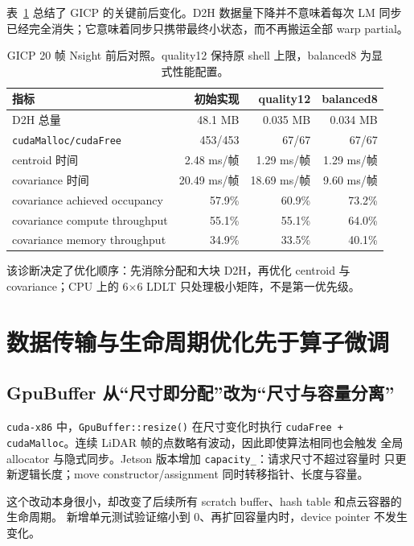 \documentclass[UTF8,a4paper,11pt,fontset=none]{ctexart}
\begin{document}
表~\ref{tab:nsight} 总结了 GICP 的关键前后变化。D2H 数据量下降并不意味着每次 LM
同步已经完全消失；它意味着同步只携带最终小状态，而不再搬运全部 warp partial。

\begin{table}[H]
  \centering
  \small
  \caption{GICP 20 帧 Nsight 前后对照。quality12 保持原 shell 上限，balanced8 为显式性能配置。}
  \label{tab:nsight}
  \begin{tabular}{@{}lrrr@{}}
    \toprule
    指标 & 初始实现 & quality12 & balanced8 \\
    \midrule
    D2H 总量 & 48.1 MB & 0.035 MB & 0.034 MB \\
    \texttt{cudaMalloc/cudaFree} & 453/453 & 67/67 & 67/67 \\
    centroid 时间 & 2.48 ms/帧 & 1.29 ms/帧 & 1.29 ms/帧 \\
    covariance 时间 & 20.49 ms/帧 & 18.69 ms/帧 & 9.60 ms/帧 \\
    covariance achieved occupancy & 57.9\% & 60.9\% & 73.2\% \\
    covariance compute throughput & 55.1\% & 55.1\% & 64.0\% \\
    covariance memory throughput & 34.9\% & 33.5\% & 40.1\% \\
    \bottomrule
  \end{tabular}
\end{table}

该诊断决定了优化顺序：先消除分配和大块 D2H，再优化 centroid 与 covariance；CPU 上的
6×6 LDLT 只处理极小矩阵，不是第一优先级。

\section{数据传输与生命周期优化先于算子微调}

\subsection{GpuBuffer 从“尺寸即分配”改为“尺寸与容量分离”}

\texttt{cuda-x86} 中，\texttt{GpuBuffer::resize()} 在尺寸变化时执行
\texttt{cudaFree + cudaMalloc}。连续 LiDAR 帧的点数略有波动，因此即使算法相同也会触发
全局 allocator 与隐式同步。Jetson 版本增加 \texttt{capacity\_}：请求尺寸不超过容量时
只更新逻辑长度；move constructor/assignment 同时转移指针、长度与容量。

这个改动本身很小，却改变了后续所有 scratch buffer、hash table 和点云容器的生命周期。
新增单元测试验证缩小到 0、再扩回容量内时，device pointer 不发生变化。
\end{document}
